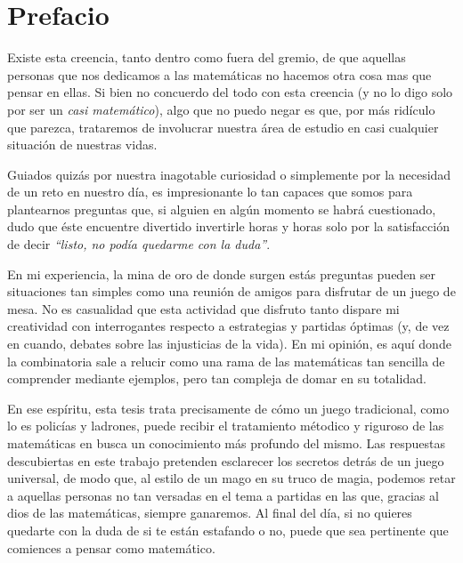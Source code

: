 \chapter*{Prefacio}

Existe esta creencia, tanto dentro como fuera del gremio, de que aquellas
personas que nos dedicamos a las matem\'aticas no hacemos otra cosa mas que
pensar en ellas. Si bien no concuerdo del todo con esta creencia (y no lo digo
solo por ser un \textit{casi matem\'atico}), algo que no puedo negar es que, por
m\'as rid\'iculo que parezca, trataremos de involucrar nuestra \'area de estudio
en casi cualquier situaci\'on de nuestras vidas.

Guiados quiz\'as por nuestra inagotable curiosidad o simplemente por la
necesidad de un reto en nuestro d\'ia, es impresionante lo tan capaces que somos
para plantearnos preguntas que, si alguien en alg\'un momento se habr\'a
cuestionado, dudo que \'este encuentre divertido invertirle horas y horas solo
por la satisfacci\'on de decir \textit{``listo, no pod\'ia quedarme con la
duda''}.

En mi experiencia, la mina de oro de donde surgen est\'as preguntas pueden ser
situaciones tan simples como una reuni\'on de amigos para disfrutar de un juego
de mesa. No es casualidad que esta actividad que disfruto tanto dispare mi
creatividad con interrogantes respecto a estrategias y partidas \'optimas (y, de
vez en cuando, debates sobre las injusticias de la vida). En mi opini\'on, es
aqu\'i donde la combinatoria sale a relucir como una rama de las matem\'aticas
tan sencilla de comprender mediante ejemplos, pero tan compleja de domar en su
totalidad.

En ese esp\'iritu, esta tesis trata precisamente de c\'omo un juego tradicional,
como lo es polic\'ias y ladrones, puede recibir el tratamiento m\'etodico y
riguroso de las matem\'aticas en busca un conocimiento m\'as profundo del mismo.
Las respuestas descubiertas en este trabajo pretenden esclarecer los secretos
detr\'as de un juego universal, de modo que, al estilo de un mago en su truco de
magia, podemos retar a aquellas personas no tan versadas en el tema a partidas
en las que, gracias al dios de las matem\'aticas, siempre ganaremos. Al final
del d\'ia, si no quieres quedarte con la duda de si te est\'an estafando o no,
puede que sea pertinente que comiences a pensar como matem\'atico.

